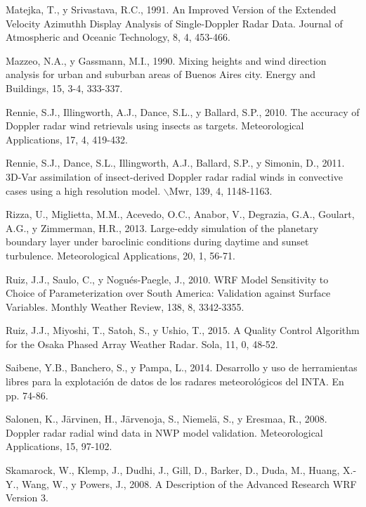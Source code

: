 \documentclass[12pt,spanish,oneside]{book}
\begin{document}
\hypertarget{ref-Matejka1991}{}
Matejka, T., y Srivastava, R.C., 1991. An Improved Version of the
Extended Velocity Azimuthh Display Analysis of Single-Doppler Radar
Data. Journal of Atmospheric and Oceanic Technology, 8, 4, 453-466.

\hypertarget{ref-Mazzeo1990}{}
Mazzeo, N.A., y Gassmann, M.I., 1990. Mixing heights and wind direction
analysis for urban and suburban areas of Buenos Aires city. Energy and
Buildings, 15, 3-4, 333-337.

\hypertarget{ref-Rennie2010}{}
Rennie, S.J., Illingworth, A.J., Dance, S.L., y Ballard, S.P., 2010. The
accuracy of Doppler radar wind retrievals using insects as targets.
Meteorological Applications, 17, 4, 419-432.

\hypertarget{ref-Rennie2011}{}
Rennie, S.J., Dance, S.L., Illingworth, A.J., Ballard, S.P., y Simonin,
D., 2011. 3D-Var assimilation of insect-derived Doppler radar radial
winds in convective cases using a high resolution model.
\(\backslash\)Mwr, 139, 4, 1148-1163.

\hypertarget{ref-Rizza2013}{}
Rizza, U., Miglietta, M.M., Acevedo, O.C., Anabor, V., Degrazia, G.A.,
Goulart, A.G., y Zimmerman, H.R., 2013. Large-eddy simulation of the
planetary boundary layer under baroclinic conditions during daytime and
sunset turbulence. Meteorological Applications, 20, 1, 56-71.

\hypertarget{ref-Ruiz2010}{}
Ruiz, J.J., Saulo, C., y Nogués-Paegle, J., 2010. WRF Model Sensitivity
to Choice of Parameterization over South America: Validation against
Surface Variables. Monthly Weather Review, 138, 8, 3342-3355.

\hypertarget{ref-Ruiz2015}{}
Ruiz, J.J., Miyoshi, T., Satoh, S., y Ushio, T., 2015. A Quality Control
Algorithm for the Osaka Phased Array Weather Radar. Sola, 11, 0, 48-52.

\hypertarget{ref-Saibene2014}{}
Saibene, Y.B., Banchero, S., y Pampa, L., 2014. Desarrollo y uso de
herramientas libres para la explotación de datos de los radares
meteorológicos del INTA. En pp. 74-86.

\hypertarget{ref-Salonen2008}{}
Salonen, K., Järvinen, H., Järvenoja, S., Niemelä, S., y Eresmaa, R.,
2008. Doppler radar radial wind data in NWP model validation.
Meteorological Applications, 15, 97-102.

\hypertarget{ref-Skamarock2008}{}
Skamarock, W., Klemp, J., Dudhi, J., Gill, D., Barker, D., Duda, M.,
Huang, X.-Y., Wang, W., y Powers, J., 2008. A Description of the
Advanced Research WRF Version 3.
\end{document}
